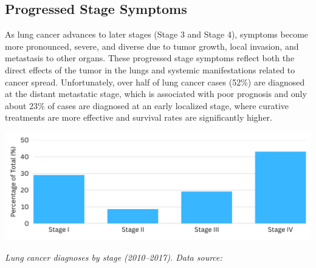 
\subsection{Progressed Stage Symptoms}

As lung cancer advances to later stages (Stage 3 and Stage 4), symptoms become more pronounced, 
severe, and diverse due to tumor growth, local invasion, and metastasis to other organs. These 
progressed stage symptoms reflect both the direct effects of the tumor in the lungs and systemic 
manifestations related to cancer spread. Unfortunately, over half of lung cancer cases (52\%) are 
diagnosed at the distant metastatic stage, which is associated with poor prognosis and only about 
23\% of cases are diagnosed at an early localized stage, where curative treatments are more 
effective and survival rates are significantly higher.

\vspace{1em}
\begin{center}
    \includegraphics[width=\textwidth]{../assets/03-clinical/stages-diagnosis.png}  

    \textit{Lung cancer diagnoses by stage (2010--2017). Data source: \cite{jco2022}}
\end{center}
\vspace{1em}

